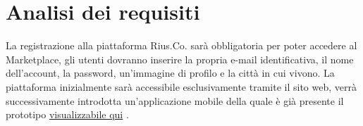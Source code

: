 \section{Analisi dei requisiti}
La registrazione alla piattaforma Rius.Co. sarà obbligatoria per poter accedere al Marketplace, gli utenti dovranno inserire la propria e-mail identificativa, il nome dell'account, la password, un'immagine di profilo e la città in cui vivono. La piattaforma inizialmente sarà accessibile esclusivamente tramite il sito web, verrà successivamente introdotta un'applicazione mobile della quale è già presente il prototipo \href{https://mauro886267.invisionapp.com/console/share/7Z10U19EHJ/476334736}{visualizzabile qui} \cite{Prototipo}.  
\medskip

\begin{figure}[hb]
    \hfill

\end{figure}
